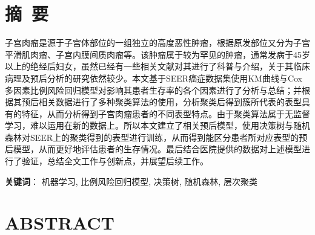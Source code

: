 \newpage

{
    \let\clearpage\relax%
    \centering{}

    \vspace{8mm}

    \chapter*{摘\ 要}
}

子宫肉瘤是源于子宫体部位的一组独立的高度恶性肿瘤，根据原发部位又分为子宫平滑肌肉瘤、子宫内膜间质肉瘤等。该肿瘤属于较为罕见的肿瘤，通常发病于45岁以上的绝经后妇女，虽然已经有一些相关文献对其进行了科普与介绍，关于其临床病理及预后分析的研究依然较少。本文基于SEER癌症数据集使用KM曲线与Cox多因素比例风险回归模型对影响其患者生存率的各个因素进行了分析与总结；并根据其预后相关数据进行了多种聚类算法的使用，分析聚类后得到簇所代表的表型具有的特征，从而分析得到子宫肉瘤患者的不同表型特点。由于聚类算法属于无监督学习，难以运用在新的数据上。所以本文建立了相关预后模型，使用决策树与随机森林对SEER上的聚类得到的表型进行训练，从而得到能区分患者所对应表型的预后模型，从而更好地评估患者的生存情况。最后结合医院提供的数据对上述模型进行了验证，总结全文工作与创新点，并展望后续工作。

\vspace{8mm}
\textbf{关键词}： 机器学习, 比例风险回归模型, 决策树, 随机森林, 层次聚类

\newpage
{
    \let\clearpage\relax%
    \centering{}
    \vspace{8mm}

    \chapter*{ABSTRACT}
}

